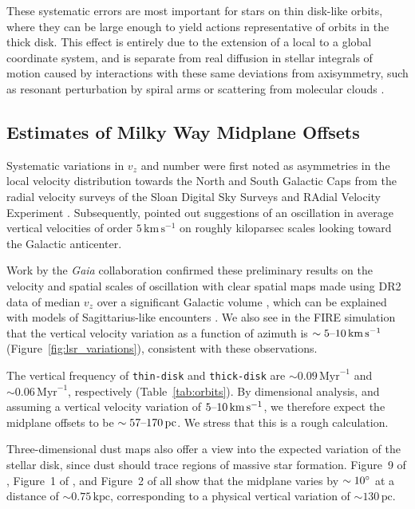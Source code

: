 \documentclass[twocolumn]{aastex62}
\newcommand{\pc}{\text{pc}}
\newcommand{\kpc}{\text{kpc}}
\newcommand{\Myr}{\text{Myr}}
\newcommand{\kms}{\text{km}\,\text{s}^{-1}}
\newcommand{\thin}{\texttt{thin-disk}}
\newcommand{\thick}{\texttt{thick-disk}}
\begin{document}
These systematic errors are most important for stars on thin disk-like orbits,
where they can be large enough to yield actions representative of orbits in
the thick disk. This effect is entirely due to the extension of a local to a
global coordinate system, and is separate from real diffusion in stellar
integrals of motion caused by interactions with these same deviations from
axisymmetry, such as resonant perturbation by spiral arms or scattering from
molecular clouds \citep{2014RvMP...86....1S}.

\subsection{Estimates of Milky Way Midplane Offsets}

\label{ssec:mw_data_midplane}

Systematic variations in $v_z$ and number were first noted as asymmetries in the local
velocity distribution towards the North and South Galactic Caps from the
radial velocity surveys of the Sloan Digital Sky Surveys
\citep{2012ApJ...750L..41W} and RAdial Velocity Experiment
\citep{2013MNRAS.436..101W}. Subsequently, \citet{2013ApJ...777L...5C} pointed
out suggestions of an oscillation in average vertical velocities of order
$5\,\kms$ on roughly kiloparsec 
scales looking toward the Galactic anticenter.

Work
by the \textit{Gaia} collaboration confirmed these preliminary results on the
velocity and spatial scales of 
oscillation with clear spatial maps made
using DR2 data of median $v_z$ over a significant Galactic volume
\citep{2018A&A...616A..11G, 2019arXiv190209569F}, which can be explained with models of Sagittarius-like encounters \citep{2013MNRAS.429..159G,2018MNRAS.481..286L,2019MNRAS.485.3134L}. We also see in the FIRE
simulation that the vertical velocity variation as a function of azimuth is
$\sim5\textup{--}10\,\kms$ (Figure~\ref{fig:lsr_variations}), consistent with
these observations.

The vertical frequency of \thin{} and \thick{} are $\sim
0.09\,\Myr^{-1}$ and $\sim0.06\,\Myr^{-1}$, respectively (Table~\ref{tab:orbits}). By dimensional
analysis, and assuming a vertical velocity variation of $5\textup{--}10\,\kms$, we
therefore expect the midplane offsets to be $\sim 57\textup{--}170\,\pc$. We
stress that this is a rough calculation.

Three-dimensional dust maps also offer a view into the expected variation of
the stellar disk, since dust should trace regions of massive star formation.
Figure~9 of \citet{2019MNRAS.483.4277C}, Figure~1 of
\citet{2019arXiv190105971L}, and Figure~2 of \citet{2019arXiv190502734G} all
show that the midplane varies by $\sim10\degree$ at a distance of
$\sim0.75\,\kpc$, corresponding to a physical vertical variation 
of $\sim130\,\pc$.
\end{document}

